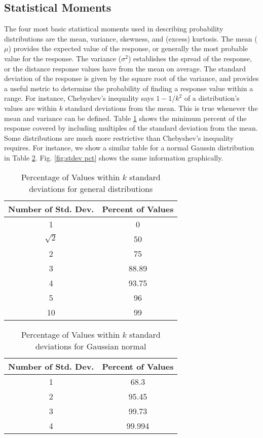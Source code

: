 \subsection{Statistical Moments}\label{sec:stat moments}
The four most basic statistical moments used in describing probability distributions are the mean, variance,
skewness, and (excess) kurtosis.
The mean ($\mu$) provides the expected value of the response, or generally the most probable
value for the response.  The variance ($\sigma^2$) establishes the spread of the response, or the distance response values
have from the mean on average.  The standard deviation of the response is given by the square root of the
variance, and provides a useful metric to determine the probability of finding a response value within a
range.  For instance, Chebyshev's inequality \cite{chebyshevineq} says $1-1/k^2$ of a distribution's values
are within $k$ standard deviations from the mean.  This is true whenever the mean and variance can be
defined.  Table
\ref{tab:cheby stdev} shows the minimum percent of the response covered by including multiples of the
standard deviation from the mean.
Some distributions are much more restrictive than Chebyshev's inequality requires.  For instance, we 
show a similar table for a normal Gaussin distribution in Table \ref{tab:norm stdev}.  Fig. \ref{fig:stdev pct}
shows the same information graphically.
\begin{table}[htb]
  \centering
  \begin{tabular}{c c}
  Number of Std. Dev. & Percent of Values \\ \hline
  1 & 0 \\
  $\sqrt{2}$ & 50 \\
  2 & 75 \\
  3 & 88.89 \\
  4 & 93.75 \\
  5 & 96 \\
  10 & 99
  \end{tabular}
  \caption{Percentage of Values within $k$ standard deviations for general distributions}
  \label{tab:cheby stdev}
\end{table}
\begin{table}[htb]
  \centering
  \begin{tabular}{c c}
  Number of Std. Dev. & Percent of Values \\ \hline
  1 & 68.3 \\
  2 & 95.45 \\
  3 & 99.73 \\
  4 & 99.994 \\
  \end{tabular}
  \caption{Percentage of Values within $k$ standard deviations for Gaussian normal}
  \label{tab:norm stdev}
\end{table}
